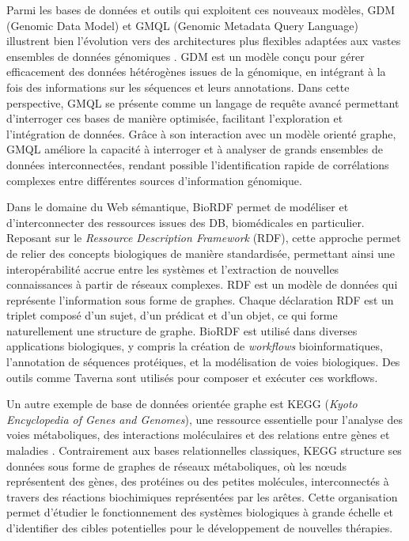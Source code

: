 Parmi les bases de données et outils qui exploitent ces nouveaux modèles, GDM (Genomic Data Model) et GMQL (Genomic Metadata Query Language) illustrent bien l’évolution vers des architectures plus flexibles adaptées aux vastes ensembles de données génomiques \cite{masseroli_genometric_2015,masseroli_modeling_2016}. GDM est un modèle conçu pour gérer efficacement des données hétérogènes issues de la génomique, en intégrant à la fois des informations sur les séquences et leurs annotations. Dans cette perspective, GMQL se présente comme un langage de requête avancé permettant d’interroger ces bases de manière optimisée, facilitant l’exploration et l’intégration de données. Grâce à son interaction avec un modèle orienté graphe, GMQL améliore la capacité à interroger et à analyser de grands ensembles de données interconnectées, rendant possible l’identification rapide de corrélations complexes entre différentes sources d’information génomique.

\newpage

Dans le domaine du Web sémantique, BioRDF \cite{cheung_journey_2009} permet de modéliser et d'interconnecter des ressources issues des DB, biomédicales en particulier. Reposant sur le \textit{Ressource Description Framework} (RDF), cette approche permet de relier des concepts biologiques de manière standardisée, permettant ainsi une interopérabilité accrue entre les systèmes et l’extraction de nouvelles connaissances à partir de réseaux complexes. RDF est un modèle de données qui représente l'information sous forme de graphes. Chaque déclaration RDF est un triplet composé d'un sujet, d'un prédicat et d'un objet, ce qui forme naturellement une structure de graphe. BioRDF est utilisé dans diverses applications biologiques, y compris la création de \textit{workflows} bioinformatiques, l'annotation de séquences protéiques, et la modélisation de voies biologiques. Des outils comme Taverna \cite{oinn_taverna_2004} sont utilisés pour composer et exécuter ces workflows.

Un autre exemple de base de données orientée graphe est KEGG (\textit{Kyoto Encyclopedia of Genes and Genomes}), une ressource essentielle pour l’analyse des voies métaboliques, des interactions moléculaires et des relations entre gènes et maladies \cite{kanehisa_kegg_2025}. Contrairement aux bases relationnelles classiques, KEGG structure ses données sous forme de graphes de réseaux métaboliques, où les n\oe uds représentent des gènes, des protéines ou des petites molécules, interconnectés à travers des réactions biochimiques représentées par les arêtes. Cette organisation permet d’étudier le fonctionnement des systèmes biologiques à grande échelle et d’identifier des cibles potentielles pour le développement de nouvelles thérapies.

